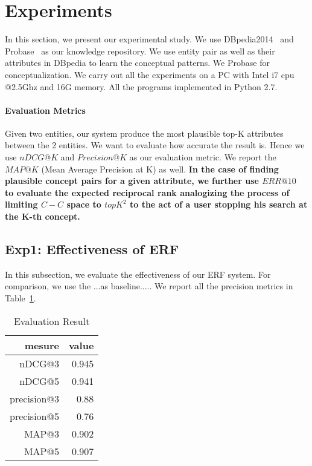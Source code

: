 
\section{Experiments}
\label{sec:exp}

In this section, we present our experimental study.
We use DBpedia2014~\cite{dbpedia} and Probase~\cite{wu2012probase} as our knowledge repository.
We use entity pair as well as their attributes in DBpedia to learn the conceptual patterns.
We Probase for conceptualization. We carry out all the experiments on a PC with Intel i7 cpu @2.5Ghz and 16G memory.
All the programs implemented in Python 2.7.

\paragraph*{Evaluation Metrics}
Given two entities, our system produce the most plausible top-K attributes between the 2 entities.
We want to evaluate how accurate the result is. Hence we use $nDCG@K$ and $Precision@K$ as our evaluation metric.
We report the $MAP@K$ (Mean Average Precision at K) as well.
{\bf  In the case of finding plausible concept pairs for a given attribute, we further use $ ERR@10$~\cite{chapelle2009expected} to evaluate the expected reciprocal rank analogizing the process of limiting $C-C$ space to $topK^2$ to the act of a user stopping his search at the K-th concept.
}


\subsection{Exp1: Effectiveness of ERF}
In this subsection, we evaluate the effectiveness of our ERF system.
For comparison, we use the ...as baseline.....
We report all the precision metrics in Table~\ref{tab:ndcg}.

\begin{table}[htbp]
  \centering
  \caption{Evaluation Result}
    \begin{tabular}{rr}
    \toprule
    mesure & value \\
    \midrule
    nDCG@3 & 0.945 \\
    nDCG@5 & 0.941 \\
    precision@3 & 0.88 \\
    precision@5 & 0.76 \\
    MAP@3 & 0.902 \\
    MAP@5 & 0.907 \\

    \bottomrule
    \end{tabular}%
  \label{tab:ndcg}%
\end{table}%


